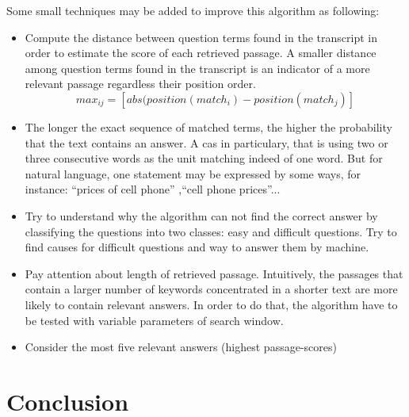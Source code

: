 \documentclass[12pt, a4paper]{report}
\begin{document}
Some small techniques may be added to improve this algorithm as following:
\begin{itemize}
 \item {Compute the distance between question terms found in the transcript in order to estimate the score of each retrieved passage. A smaller distance among question terms found in the transcript is an indicator of a more relevant passage regardless their position order.
\begin{displaymath}
 max_{ij} = [abs(position(match_i) - position(match_j)]
\end{displaymath}

}
 \item {The longer the exact sequence of matched terms, the higher the probability that the text contains an answer. A cas in particulary, that is using two or three consecutive words as the unit matching indeed of one word. But for natural language, one statement may be expressed by some ways, for instance: ``prices of cell phone'' ,``cell phone prices''...}
 \item {Try to understand why the algorithm can not find the correct answer by classifying the questions into two classes: easy and difficult questions. Try to find causes for difficult questions and way to answer them by machine.}
 \item {Pay attention about length of retrieved passage. Intuitively, the passages that contain a larger number of keywords concentrated in a shorter text are more likely to contain relevant answers. In order to do that, the algorithm have to be tested with variable parameters of search window.}

 \item{Consider the most five relevant answers (highest passage-scores)}

\end{itemize}

\newpage
\chapter{Conclusion}
\end{document}
